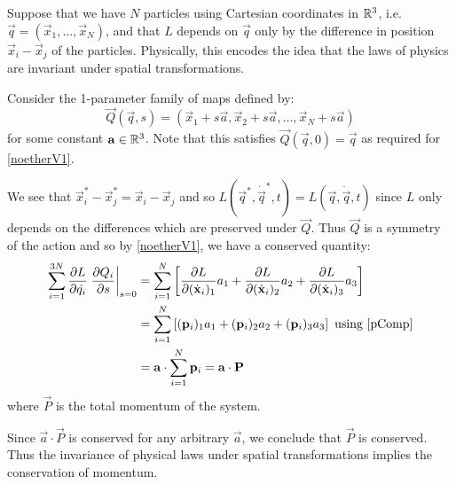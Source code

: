 \documentclass[../main.tex]{subfiles}
\begin{document}
\begin{example}
  Suppose that we have $N$ particles using Cartesian coordinates in $\mathbb{R}^3$, i.e. $\vec{q} = (\vec{x}_1, \ldots, \vec{x}_N)$, and that $L$ depends on $\vec{q}$ only by the difference in position $\vec{x}_i - \vec{x}_j$ of the particles.
  Physically, this encodes the idea that the laws of physics are invariant under spatial transformations.

  Consider the 1-parameter family of maps defined by:
  \[
    \vec{Q}(\vec{q}, s) = (\vec{x}_1 + s\vec{a}, \vec{x}_2 + s\vec{a}, \ldots, \vec{x}_N + s\vec{a})
  \]
  for some constant $\mathbf{\bm{a}} \in \mathbb{R}^3$.
  Note that this satisfies $\vec{Q}(\vec{q}, 0) = \vec{q}$ as required for \cref{noetherV1}.

  We see that $\vec{x}^{*}_i - \vec{x}^{*}_j = \vec{x}_i - \vec{x}_j$ and so $L(\vec{q}^{*}, \dot{\vec{q}}^{*}, t) = L(\vec{q}, \dot{\vec{q}}, t)$ since $L$ only depends on the differences which are preserved under $\vec{Q}$.
  Thus $\vec{Q}$ is a symmetry of the action and so by \cref{noetherV1}, we have a conserved quantity:
  \begin{align*}
    \sum_{i = 1}^{3N} \pderiv{L}{\dot{q_i}} \at{\pderiv{Q_i}{s}}{s = 0} &= \sum_{i = 1}^{N} \left[\pderiv{L}{(\dot{\vec{x}}_i)_1} a_1 + \pderiv{L}{(\dot{\vec{x}}_i)_2} a_2 + \pderiv{L}{(\dot{\vec{x}}_i)_3} a_3\right] \\
                                                                        &= \sum_{i = 1}^{N} \left[(\vec{p}_i)_1 a_1 + (\vec{p}_i)_2 a_2 + (\vec{p}_i)_3 a_3\right] \text{ using \cref{pComp}} \\
                                                                        &= \vec{a} \cdot \sum_{i = 1}^{N} \vec{p}_i = \vec{a} \cdot \vec{P}
  \end{align*}
  where $\vec{P}$ is the total momentum of the system.

  Since $\vec{a} \cdot \vec{P}$ is conserved for any arbitrary $\vec{a}$, we conclude that $\vec{P}$ is conserved.
  Thus the invariance of physical laws under spatial transformations implies the conservation of momentum.
\end{example}
\end{document}
